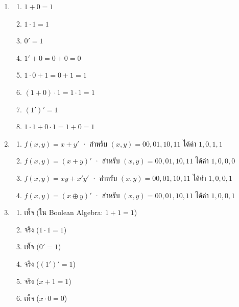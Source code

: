 \answerkeyhead
\label{sec:exercises-solutions}

\begin{enumerate}[series=anskey,label={},leftmargin=0pt,itemsep=0.6em]
    \item
    \begin{enumerate}[label=\textbf{\thechapter.\arabic{enumi}.\arabic*}]
        \item $1 + 0 = 1$
        \item $1 \cdot 1 = 1$
        \item $0' = 1$
        \item $1' + 0 = 0 + 0 = 0$
        \item $1 \cdot 0 + 1 = 0 + 1 = 1$
        \item $(1 + 0) \cdot 1 = 1 \cdot 1 = 1$
        \item $(1')' = 1$
        \item $1 \cdot 1 + 0 \cdot 1 = 1 + 0 = 1$
    \end{enumerate}

    \item
    \begin{enumerate}[label=\textbf{\thechapter.\arabic{enumi}.\arabic*}]
        \item $f(x,y)=x+y'$ · สำหรับ $(x,y)=00,01,10,11$ ได้ค่า $1,0,1,1$
        \item $f(x,y)=(x+y)'$ · สำหรับ $(x,y)=00,01,10,11$ ได้ค่า $1,0,0,0$
        \item $f(x,y)=xy+x'y'$ · สำหรับ $(x,y)=00,01,10,11$ ได้ค่า $1,0,0,1$
        \item $f(x,y)=(x\oplus y)'$ · สำหรับ $(x,y)=00,01,10,11$ ได้ค่า $1,0,0,1$
    \end{enumerate}

    \item
    \begin{enumerate}[label=\textbf{\thechapter.\arabic{enumi}.\arabic*}]
        \item เท็จ (ใน Boolean Algebra: $1+1=1$)
        \item จริง ($1 \cdot 1 = 1$)
        \item เท็จ ($0' = 1$)
        \item จริง ($(1')'=1$)
        \item จริง ($x+1=1$)
        \item เท็จ ($x \cdot 0 = 0$)
    \end{enumerate}
\end{enumerate}

